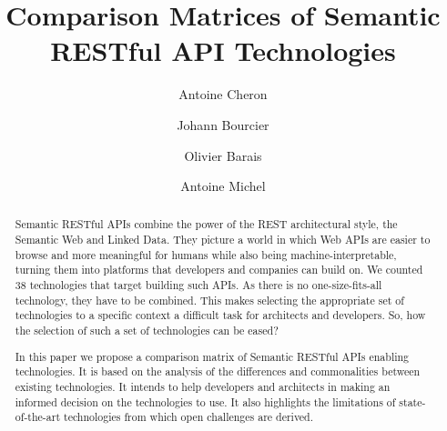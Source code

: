 \documentclass[runningheads]{llncs}
\begin{document}
%
\title{Comparison Matrices of Semantic RESTful API Technologies}
%
%
\author{Antoine Cheron \and
Johann Bourcier \and
Olivier Barais \and
Antoine Michel}
%
%
%
\maketitle              %

\begin{abstract}
Semantic RESTful APIs combine the power of the REST architectural style, the Semantic Web and Linked Data. They picture a world in which Web APIs are easier to browse and more meaningful for humans while also being machine-interpretable, turning them into platforms that developers and companies can build on. We counted 38 technologies that target building such APIs. As there is no one-size-fits-all technology, they have to be combined. This makes selecting the appropriate set of technologies to a specific context a difficult task for architects and developers. So, how the selection of such a set of technologies can be eased?

In this paper we propose a comparison matrix of Semantic RESTful APIs enabling technologies. It is based on the analysis of the differences and commonalities between existing technologies. It intends to help developers and architects in making an informed decision on the technologies to use. It also highlights the limitations of state-of-the-art technologies from which open challenges are derived.

\end{abstract}
%







%
%
%
% 
% 
%



\end{document}
